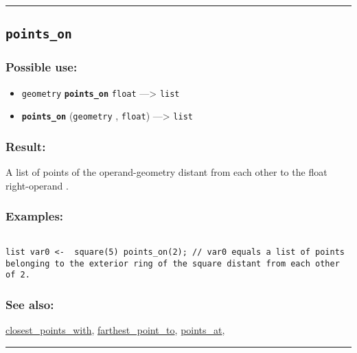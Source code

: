 \documentclass[]{book}
\providecommand{\tightlist}{%
  \setlength{\itemsep}{0pt}\setlength{\parskip}{0pt}}
\theoremstyle{definition}
\theoremstyle{definition}
\theoremstyle{definition}
\theoremstyle{remark}
\begin{document}
\begin{center}\rule{0.5\linewidth}{\linethickness}\end{center}

\subsection{\texorpdfstring{\texttt{points\_on}}{points\_on}}\label{points_on}

\subsubsection{Possible use:}\label{possible-use-411}

\begin{itemize}
\tightlist
\item
  \texttt{geometry} \textbf{\texttt{points\_on}} \texttt{float}
  ---\textgreater{} \texttt{list}
\item
  \textbf{\texttt{points\_on}} (\texttt{geometry} , \texttt{float})
  ---\textgreater{} \texttt{list}
\end{itemize}

\subsubsection{Result:}\label{result-397}

A list of points of the operand-geometry distant from each other to the
float right-operand .

\subsubsection{Examples:}\label{examples-285}

\begin{verbatim}
 
list var0 <-  square(5) points_on(2); // var0 equals a list of points belonging to the exterior ring of the square distant from each other of 2.
\end{verbatim}

\subsubsection{See also:}\label{see-also-164}

\href{OperatorsBC\#closest_points_with}{closest\_points\_with},
\href{OperatorsDH\#farthest_point_to}{farthest\_point\_to},
\href{OperatorsNR\#points_at}{points\_at},

\begin{center}\rule{0.5\linewidth}{\linethickness}\end{center}
\end{document}
